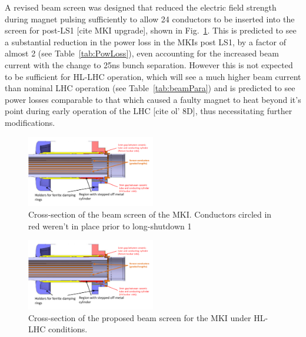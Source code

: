 \documentclass[a4paper,
              ]{jacow}
\begin{document}
A revised beam screen was designed that reduced the electric field strength during magnet pulsing sufficiently to allow 24 conductors to be inserted into the screen for post-LS1 [cite MKI upgrade], shown in Fig.~\ref{fig:BeamScreenPostLS1}. This is predicted to see a substantial reduction in the power loss in the MKIs post LS1, by a factor of almost 2 (see Table~\ref{tab:PowLoss}), even accounting for the increased beam current with the change to 25ns bunch separation. However this is not expected to be sufficient for HL-LHC operation, which will see a much higher beam current than nominal LHC operation (see Table~\ref{tab:beamPara}) and is predicted to see power losses comparable to that which caused a faulty magnet to heat beyond it's point during early operation of the LHC [cite ol' 8D], thus necessitating further modifications.

\begin{figure}
\begin{center}
\includegraphics[width=0.5\textwidth]{beamScreenCrossSectionLabelled.pdf}
\caption{Cross-section of the beam screen of the MKI. Conductors circled in red weren't in place prior to long-shutdown 1}
\label{fig:BeamScreenPostLS1}
\end{center}
\end{figure}

\begin{figure}
\begin{center}
\includegraphics[width=0.5\textwidth]{beamScreenCrossSectionLabelled.pdf}
\caption{Cross-section of the proposed beam screen for the MKI under HL-LHC conditions.}
\label{fig:BeamScreenHLLHC}
\end{center}
\end{figure}
\end{document}
